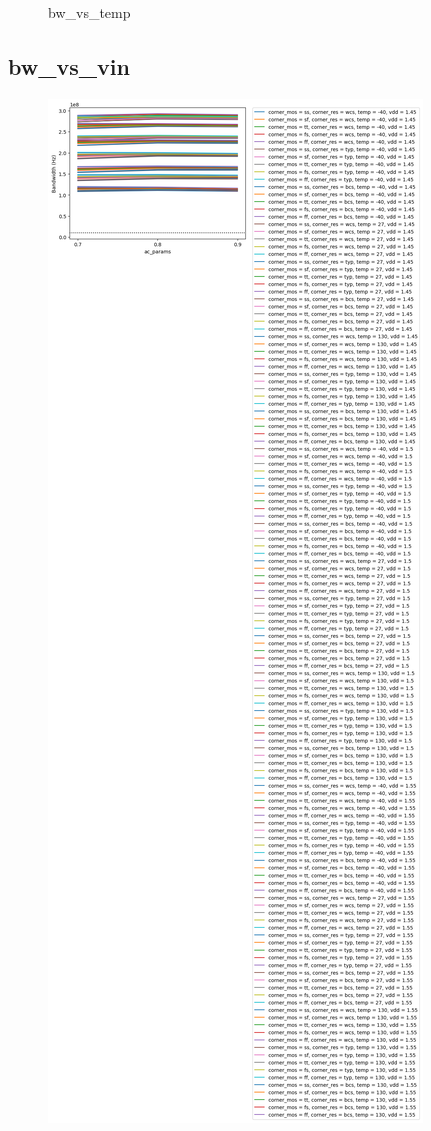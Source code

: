 \documentclass[
  a4paper,
  DIV=11,
  numbers=noendperiod]{scrartcl}
\begin{document}
\begin{tcolorbox}
\begin{figure}[H]
{}

\caption{bw\_vs\_temp}

\end{figure}%

\subsection*{bw\_vs\_vin}\label{bw_vs_vin-1}

\begin{figure}[H]

{\centering \includegraphics{./cace/_docs/ota-improved/schematic/bw_vs_vin.png}

}
\end{figure}
\end{tcolorbox}
\end{document}
